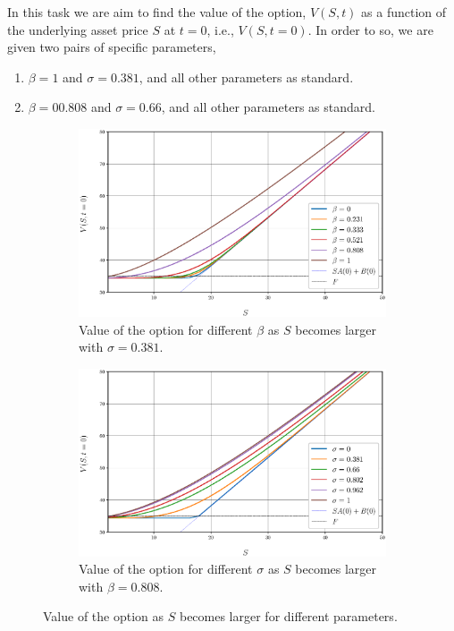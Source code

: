 In this task we are aim to find the value of the option, $V(S,t)$ as a function of the underlying asset price $S$ at $t=0$, i.e., $V(S,t=0)$. In order to so, we are given two pairs of specific parameters, 
\begin{enumerate}[wide, labelindent=0cm]
	\item $\beta=1$ and $\sigma = 0.381$, and all other parameters as standard.
	\item $\beta=0 0.808$ and $\sigma=0.66$, and all other parameters as standard.
\end{enumerate}

\begin{figure}[htbp]
	\centering
	\captionsetup{width=.5\linewidth}
	\begin{subfigure}[b]{0.49\textwidth}
		\includegraphics[width=\textwidth]{img/Q1/ComparisonDifferentBetas_sigma06600.eps}
		\captionsetup{width=.8\linewidth}
		\caption{Value of the option for different $\beta$ as $S$ becomes larger with $\sigma = 0.381$.}
		\label{changingBeta}
	\end{subfigure}
	\begin{subfigure}[b]{0.49\textwidth}
		\includegraphics[width=\textwidth]{img/Q1/ComparisonDifferentSigmas_beta0808.eps}
		\captionsetup{width=.8\linewidth}
		\caption{Value of the option for different $\sigma$ as $S$ becomes larger with $\beta=0.808$.}
		\label{changingSigma}
	\end{subfigure}
	\caption{Value of the option as $S$ becomes larger for different parameters.}
	\label{S_larger}
\end{figure}

